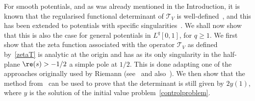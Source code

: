 \documentclass[JEP,XML,SOM,Unicode,NoEqCountersInSection,NoFloatCountersInSection]{cedram}
\theoremstyle{plain}
\theoremstyle{definition}
\newcommand{\ttt}{\mathscr{T}}
\let\balpha q
\begin{document}
For smooth potentials, and as was already mentioned in the Introduction, it is known that the regularised functional determinant of $\ttt_V$ is
well-defined~\cite{BFK,Levit-Smilansky}, and this has been extended to potentials with specific singularities~\cite{Lesch,Lesch-Tolk}.
We shall now show that this is also the case for general potentials in $L^\balpha[0,1]$, for $\balpha\geq 1$. We first show that the
zeta function associated with the operator $\ttt_V$ as defined by~\eqref{zetaT} is analytic at the origin and has as its only singularity
in the half-plane $\re(s)>-1/2$ a simple pole at $1/2$. This is done adapting one of the approaches originally used by Riemann (see~\cite{riem}
and also~\cite[p.\,21ff]{titc}). We then show that the method from~\cite{Levit-Smilansky} can be used to prove that the determinant is still given by $2y(1)$,
where $y$ is the solution of the initial value problem~\eqref{controlproblem}.
\end{document}
